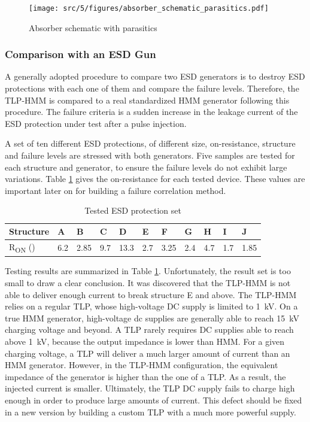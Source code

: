 \begin{figure}[!h]
  \centering
  \texttt{[image: src/5/figures/absorber\_schematic\_parasitics.pdf]}
  \caption{Absorber schematic with parasitics}
  \label{fig:absorber_schematic_parasitics}
\end{figure}

\subsubsection{Comparison with an ESD Gun}

A generally adopted procedure to compare two ESD generators is to destroy ESD protections with each one of them and compare the failure levels.
Therefore, the TLP-HMM is compared to a real standardized HMM generator following this procedure.
The failure criteria is a sudden increase in the leakage current of the ESD protection under test after a pulse injection.

A set of ten different ESD protections, of different size, on-resistance, structure and failure levels are stressed with both generators.
Five samples are tested for each structure and generator, to ensure the failure levels do not exhibit large variations.
Table \ref{tab:esd-protections} gives the on-resistance for each tested device.
These values are important later on for building a failure correlation method.

\begin{table}[!h]
\centering
\begin{tabular}{@{}lllllllllll@{}}
\toprule
Structure                          & A    & B    & C     & D    & E   & F   & G   & H   & I   & J   \\ \midrule
R\textsubscript{ON} (\textOmega{}) & 6.2  & 2.85 & 9.7  & 13.3 & 2.7 & 3.25& 2.4 & 4.7 & 1.7 & 1.85 \\
\end{tabular}
\caption{Tested ESD protection set}
\label{tab:esd-protections}
\end{table}

Testing results are summarized in Table \ref{tab:esd-protections}.
Unfortunately, the result set is too small to draw a clear conclusion.
It was discovered that the TLP-HMM is not able to deliver enough current to break structure E and above.
The TLP-HMM relies on a regular TLP, whose high-voltage DC supply is limited to \SI{1}{\kilo\volt}.
On a true HMM generator, high-voltage \gls{dc} supplies are generally able to reach \SI{15}{\kilo\volt} charging voltage and beyond.
A TLP rarely requires DC supplies able to reach above \SI{1}{\kilo\volt}, because the output impedance is lower than HMM.
For a given charging voltage, a TLP will deliver a much larger amount of current than an HMM generator.
However, in the TLP-HMM configuration, the equivalent impedance of the generator is higher than the one of a TLP.
As a result, the injected current is smaller.
Ultimately, the TLP DC supply fails to charge high enough in order to produce large amounts of current.
This defect should be fixed in a new version by building a custom TLP with a much more powerful supply.

